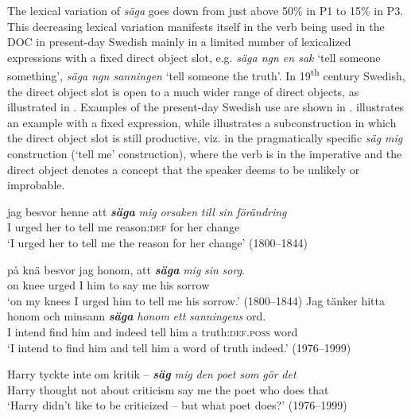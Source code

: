 \documentclass[output=paper]{langscibook}
\begin{document}
The lexical variation of \textit{säga} goes down from just above 50\% in P1 to 15\% in P3. This decreasing lexical variation manifests itself in the verb being used in the DOC in present-day Swedish mainly in a limited number of lexicalized expressions with a fixed direct object slot, e.g. \textit{säga ngn en sak} ‘tell someone something’, \textit{säga ngn sanningen} ‘tell someone the truth’. In 19\textsuperscript{th} century Swedish, the direct object slot is open to a much wider range of direct objects, as illustrated in . Examples of the present-day Swedish use are shown in .  illustrates an example with a fixed expression, while  illustrates a subconstruction in which the direct object slot is still productive, viz. in the pragmatically specific \textit{säg mig} construction (‘tell me’ construction), where the verb is in the imperative and the direct object denotes a concept that the speaker deems to be unlikely or improbable.


\ea \label{ex:valdeson:14}
\ea
\gll jag besvor   henne  att \textbf{\textit{säga}} \textit{mig} \textit{orsaken}    \textit{till}     \textit{sin}  \textit{förändring}\\
      I      urged     her       to     tell   me  reason:\textsc{def} for     her     change\\
\glt  ‘I urged her to tell me the reason for her change’ (1800–1844)

\ex
\gll på    knä  besvor  jag  honom,  att \textbf{\textit{säga}} \textit{mig}   \textit{sin}   \textit{sorg}.\\
      on    knee   urged   I       him     to     say   me   his   sorrow\\
     \glt ‘on my knees I urged him to tell me his sorrow.’ (1800–1844)
\z
\ex \label{ex:valdeson:15}
\ea \label{ex:valdeson:15a}\gll Jag tänker hitta    honom    och  minsann \textbf{\textit{säga}} \textit{honom} \textit{ett}    \textit{sanningens}    ord.\\
      I      intend    find    him      and    indeed    tell      him a       truth:\textsc{def.poss}  word\\
\glt ‘I intend to find him and tell him a word of truth indeed.’ (1976–1999)

\ex \label{ex:valdeson:15b}\gll Harry  tyckte     inte  om    kritik  –  \textbf{\textit{säg}} \textit{mig}  \textit{den}  \textit{poet}  \textit{som}  \textit{gör}  \textit{det}  \\
        Harry    thought    not    about    criticism {} say   me    the    poet    who    does  that\\
\glt ‘Harry didn’t like to be criticized – but what poet does?’ (1976–1999)
\z
\z
\end{document}
